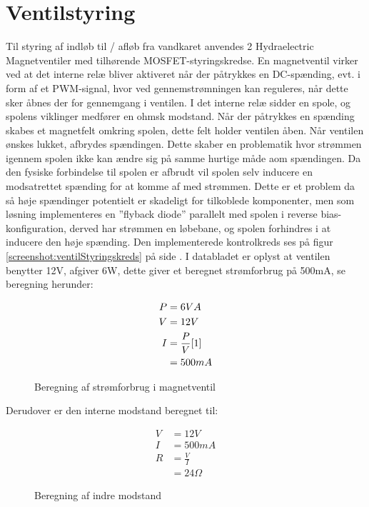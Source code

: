 \section{Ventilstyring}
Til styring af indløb til / afløb fra vandkaret anvendes 2 Hydraelectric Magnetventiler med tilhørende MOSFET-styringskredse. En magnetventil virker ved at det interne relæ bliver aktiveret når der påtrykkes en DC-spænding, evt. i form af et PWM-signal, hvor ved gennemstrømningen kan reguleres, når dette sker åbnes der for gennemgang i ventilen. I det interne relæ sidder en spole, og spolens viklinger medfører en ohmsk modstand. Når der påtrykkes en spænding skabes et magnetfelt omkring spolen, dette felt holder ventilen åben. Når ventilen ønskes lukket, afbrydes spændingen. Dette skaber en problematik hvor strømmen igennem spolen ikke kan ændre sig på samme hurtige måde aom spændingen. Da den fysiske forbindelse til spolen er afbrudt vil spolen selv inducere en modsatrettet spænding for at komme af med strømmen. Dette er et problem da så høje spændinger potentielt er skadeligt for tilkoblede komponenter, men som løsning implementeres en ”flyback diode” parallelt med spolen i reverse bias-konfiguration, derved har strømmen en løbebane, og spolen forhindres i at inducere den høje spænding. Den implementerede kontrolkreds ses på figur \ref{screenshot:ventilStyringskreds} på side \pageref{screenshot:ventilStyringskreds}.
I databladet er oplyst at ventilen benytter 12V, afgiver 6W, dette giver et beregnet strømforbrug på 500mA, se beregning herunder:

\begin{figure}[!h]
		\begin{align*}
			P &= 6 VA \\ 
			V &= 12 V \\
			I &= \frac{P}{V} \eqref{1}\\ 
			&= 500mA
		\end{align*}
\label{eq:ventilA}
\caption{Beregning af strømforbrug i magnetventil}
\end{figure}

Derudover er den interne modstand beregnet til: 

\begin{figure}[!h]
	\begin{align*}
		V &= 12 V \\ 
		I &= 500 mA \\
		R &= \frac{V}{I} \\ 
		&= 24 \Omega
	\end{align*}
\caption{Beregning af indre modstand}
\label{eq:ventilOhm}
\end{figure}

